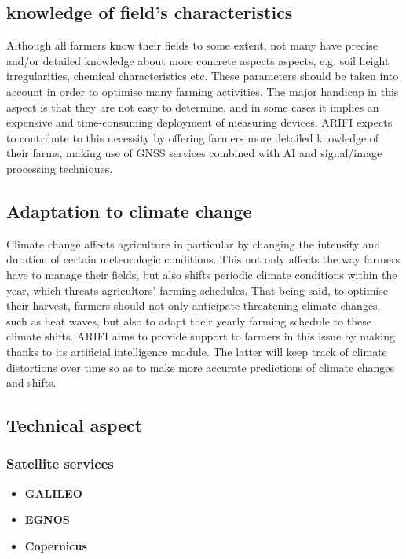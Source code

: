 \subsection{knowledge of field's characteristics}
Although all farmers know their fields to some extent, not many have precise and/or detailed knowledge about more concrete aspects aspects, e.g. soil height irregularities, chemical characteristics etc. These parameters should be taken into account in order to optimise many farming activities. The major handicap in this aspect is that they are not easy to determine, and in some cases it implies an expensive and time-consuming deployment of measuring devices. ARIFI expects to contribute to this necessity by offering farmers more detailed knowledge of their farms, making use of GNSS services combined with AI and signal/image processing techniques.
\subsection{Adaptation to climate change}
Climate change affects agriculture in particular by changing the intensity and duration of certain meteorologic conditions. This not only affects the way farmers have to manage their fields, but also shifts periodic climate conditions within the year, which threats agricultors' farming schedules. That being said, to optimise their harvest, farmers should not only anticipate threatening climate changes, such as heat waves, but also to adapt their yearly farming schedule to these climate shifts.
ARIFI aims to provide support to farmers in this issue by making thanks to its artificial intelligence module. The latter will keep track of climate distortions over time so as to make more accurate predictions of climate changes and shifts.  

\subsection{Technical aspect}
\subsubsection{Satellite services}
\begin{itemize}
    \item \textbf{GALILEO}
    \item \textbf{EGNOS}
    \item \textbf{Copernicus}
    
\end{itemize}
